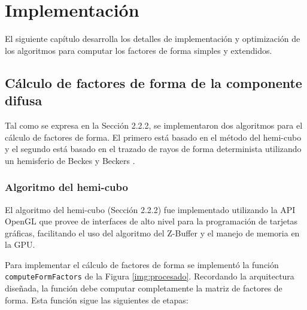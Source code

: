 \chapter{Implementación}
\label{ch:chap04}

El siguiente capítulo desarrolla los detalles de implementación y optimización de los algoritmos para computar los factores de forma simples y extendidos.

\section{Cálculo de factores de forma de la componente difusa}
\label{sec:dif-impl}

Tal como se expresa en la Sección 2.2.2, se implementaron dos algoritmos para el cálculo de factores de forma. El primero está basado en el método del hemi-cubo y el segundo está basado en el trazado de rayos de forma determinista utilizando un hemisferio de Beckes y Beckers \cite{Beckers}.

\subsection{Algoritmo del hemi-cubo}

El algoritmo del hemi-cubo (Sección 2.2.2) fue implementado utilizando la API OpenGL que provee de interfaces de alto nivel para la programación de tarjetas gráficas, facilitando el uso del algoritmo del Z-Buffer y el manejo de memoria en la GPU.

Para implementar el cálculo de factores de forma se implementó la función \verb|computeFormFactors| de la Figura \ref{img:procesado}. Recordando la arquitectura diseñada, la función debe computar completamente la matriz de factores de forma. Esta función sigue las siguientes de etapas:

